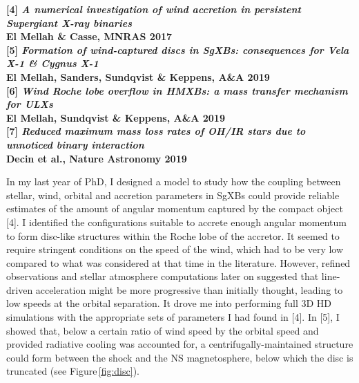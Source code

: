 \documentclass[12pt,onecolumn]{article}
\makeatletter
\newcommand{\sgxs}{SgXBs\xspace}
\newcommand*{\hmxb}{HMXB\@\xspace}
\newcommand*{\ns}{NS\@\xspace}
\makeatother
\begin{document}
\footnotesize
\textbf{[4] \textit{A numerical investigation of wind accretion in persistent Supergiant X-ray binaries}}\\
\hspace*{16pt}\textbf{El Mellah \& Casse, MNRAS 2017}\\
\textbf{[5] \textit{Formation of wind-captured discs in SgXBs: consequences for Vela X-1 \& Cygnus X-1}}\\
\hspace*{16pt}\textbf{El Mellah, Sanders, Sundqvist \& Keppens, A\&A 2019}\\
\textbf{[6] \textit{Wind Roche lobe overflow in HMXBs: a mass transfer mechanism for ULXs}}\\
\hspace*{16pt}\textbf{El Mellah, Sundqvist \& Keppens, A\&A 2019}\\
\textbf{[7] \textit{Reduced maximum mass loss rates of OH/IR stars due to unnoticed binary interaction}}\\
\hspace*{16pt}\textbf{Decin et al., Nature Astronomy 2019}\\

\normalsize


In my last year of PhD, I designed a model to study how the coupling between stellar, wind, orbital and accretion parameters in \sgxs could provide reliable estimates of the amount of angular momentum captured by the compact object [4]. I identified the configurations suitable to accrete enough angular momentum to form disc-like structures within the Roche lobe of the accretor. It seemed to require stringent conditions on the speed of the wind, which had to be very low compared to what was considered at that time in the literature. However, refined observations and stellar atmosphere computations later on suggested that line-driven acceleration might be more progressive than initially thought, leading to low speeds at the orbital separation. It drove me into performing full 3D HD simulations with the appropriate sets of parameters I had found in [4]. In [5], I showed that, below a certain ratio of wind speed by the orbital speed and provided radiative cooling was accounted for, a centrifugally-maintained structure could form between the shock and the \ns magnetosphere, below which the disc is truncated (see Figure\,\ref{fig:disc}). 
\end{document}
